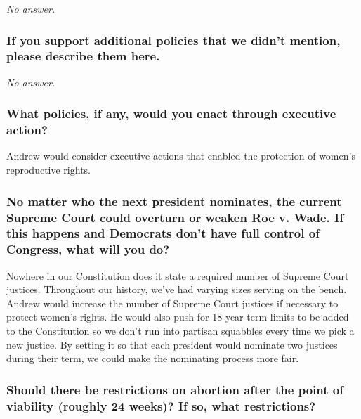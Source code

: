 \emph{No answer.}

\hypertarget{if-you-support-additional-policies-that-we-didnt-mention-please-describe-them-here-9}{%
\subsubsection{If you support additional policies that we didn't
mention, please describe them
here.}\label{if-you-support-additional-policies-that-we-didnt-mention-please-describe-them-here-9}}

\emph{No answer.}

\hypertarget{what-policies-if-any-would-you-enact-through-executive-action-9}{%
\subsubsection{What policies, if any, would you enact through executive
action?}\label{what-policies-if-any-would-you-enact-through-executive-action-9}}

Andrew would consider executive actions that enabled the protection of
women's reproductive rights.

\hypertarget{no-matter-who-the-next-president-nominates-the-current-supreme-court-could-overturn-or-weaken-roe-v-wade-if-this-happens-and-democrats-dont-have-full-control-of-congress-what-will-you-do-9}{%
\subsubsection{No matter who the next president nominates, the current
Supreme Court could overturn or weaken Roe v. Wade. If this happens and
Democrats don't have full control of Congress, what will you
do?}\label{no-matter-who-the-next-president-nominates-the-current-supreme-court-could-overturn-or-weaken-roe-v-wade-if-this-happens-and-democrats-dont-have-full-control-of-congress-what-will-you-do-9}}

Nowhere in our Constitution does it state a required number of Supreme
Court justices. Throughout our history, we've had varying sizes serving
on the bench. Andrew would increase the number of Supreme Court justices
if necessary to protect women's rights. He would also push for 18-year
term limits to be added to the Constitution so we don't run into
partisan squabbles every time we pick a new justice. By setting it so
that each president would nominate two justices during their term, we
could make the nominating process more fair.

\hypertarget{should-there-be-restrictions-on-abortion-after-the-point-of-viability-roughly-24-weeks-if-so-what-restrictions-9}{%
\subsubsection{Should there be restrictions on abortion after the point
of viability (roughly 24 weeks)? If so, what
restrictions?}\label{should-there-be-restrictions-on-abortion-after-the-point-of-viability-roughly-24-weeks-if-so-what-restrictions-9}}


